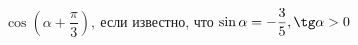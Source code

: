 \begin{ex}[type=equation]
	\begin{condition}
		$\cos {\left(\alpha + \dfrac{\pi}{3}\right)} ,\  $если известно, что $\sin \alpha = -\dfrac{3}{5},\tg \alpha > 0$
	\end{condition}
\end{ex}